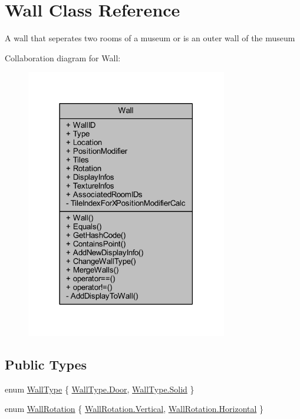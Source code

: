 \hypertarget{class_wall}{}\section{Wall Class Reference}
\label{class_wall}


A wall that seperates two rooms of a museum or is an outer wall of the museum  




Collaboration diagram for Wall\+:
\nopagebreak
\begin{figure}[H]
\begin{center}
\leavevmode
\includegraphics[width=249pt]{class_wall__coll__graph}
\end{center}
\end{figure}
\subsection*{Public Types}
\begin{DoxyCompactItemize}
\item 
enum \mbox{\hyperlink{class_wall_a1366d94ac70428624a6703d7db89638d}{Wall\+Type}} \{ \mbox{\hyperlink{class_wall_a1366d94ac70428624a6703d7db89638daf44e14d49cd011d1e873d9fe0c4624f1}{Wall\+Type.\+Door}}, 
\mbox{\hyperlink{class_wall_a1366d94ac70428624a6703d7db89638dae41480b6bbfbf7407974a88d3d34f4fa}{Wall\+Type.\+Solid}}
 \}
\item 
enum \mbox{\hyperlink{class_wall_a0ff16a0e73bfc8f0d89c5fd6849e3a97}{Wall\+Rotation}} \{ \mbox{\hyperlink{class_wall_a0ff16a0e73bfc8f0d89c5fd6849e3a97a06ce2a25e5d12c166a36f654dbea6012}{Wall\+Rotation.\+Vertical}}, 
\mbox{\hyperlink{class_wall_a0ff16a0e73bfc8f0d89c5fd6849e3a97ac1b5fa03ecdb95d4a45dd1c40b02527f}{Wall\+Rotation.\+Horizontal}}
 \}
\end{DoxyCompactItemize}
